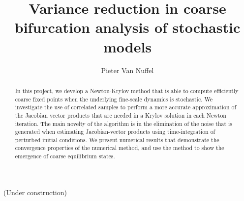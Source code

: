 \documentclass[]{article}
\title{Variance reduction in coarse bifurcation analysis of stochastic models}
\author{Pieter Van Nuffel}
\theoremstyle{definition}
\begin{document}
\maketitle{}

(Under construction)
\begin{abstract}


In this project, we develop a Newton-Krylov method that is able to compute efficiently coarse fixed points when the underlying fine-scale dynamics is stochastic. We investigate the use of correlated samples to perform a more accurate approximation of the Jacobian vector products that are needed in a Krylov solution in each Newton iteration. The main novelty of the algorithm is in the elimination of the noise that is generated when estimating Jacobian-vector products using time-integration of perturbed initial conditions. We present numerical results that demonstrate the convergence properties of the numerical method, and use the method to show  the emergence of coarse equilibrium states.









\end{abstract}
\end{document}
